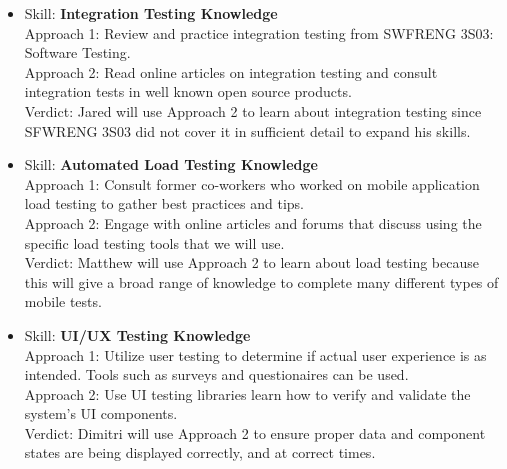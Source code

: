 \documentclass[12pt, titlepage]{article}
\begin{document}
\begin{enumerate}
\begin{itemize}
			\item Skill: \textbf{Integration Testing Knowledge}
			\\Approach 1: Review and practice integration testing from SWFRENG 3S03: Software Testing.
			\\Approach 2: Read online articles on integration testing and consult integration tests in well known open source products.
			\\Verdict: Jared will use Approach 2 to learn about integration testing since SFWRENG 3S03 did not cover it in sufficient detail to expand his skills.

			\item Skill: \textbf{Automated Load Testing Knowledge}
			\\Approach 1: Consult former co-workers who worked on mobile application load testing to gather best practices and tips.
			\\Approach 2: Engage with online articles and forums that discuss using the specific load testing tools that we will use.
			\\Verdict: Matthew will use Approach 2 to learn about load testing because this will give a broad range of knowledge to complete many different types of mobile tests.
			
			\item Skill: \textbf{UI/UX Testing Knowledge}
			\\Approach 1: Utilize user testing to determine if actual user experience is as intended. Tools such as surveys and questionaires can be used.
			\\Approach 2: Use UI testing libraries learn how to verify and validate the system's UI components.
			\\Verdict: Dimitri will use Approach 2 to ensure proper data and component states are being displayed correctly, and at correct times. 
			
		\end{itemize}

	\end{enumerate}
		
	
\end{document}
